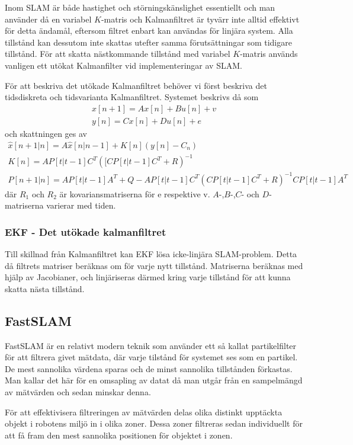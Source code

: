 \documentclass[a4paper,12pt,fleqn]{article}
\begin{document}
Inom SLAM är både hastighet och störningskänslighet essentiellt och man använder då en variabel $K$-matris och Kalmanfiltret är tyvärr inte alltid effektivt för detta ändamål, eftersom filtret enbart kan användas för linjära system. Alla tillstånd kan dessutom inte skattas utefter samma förutsättningar som tidigare tillstånd. För att skatta nästkommande tillstånd med variabel $K$-matris används vanligen ett utökat Kalmanfilter vid implementeringar av SLAM. 

För att beskriva det utökade Kalmanfiltret behöver vi först beskriva det tidsdiskreta och tidsvarianta Kalmanfiltret. Systemet beskrivs då som 
\begin{gather}
x[n+1] = Ax[n] + Bu[n]+v \\
y[n] = Cx[n] + Du[n] + e
\end{gather}
och skattningen ges av
\begin{gather}
	\hat{x}[n+1|n] = A\hat{x}[n|n-1] + K[n](y[n]-C_n) \\
	K[n]=AP[t|t-1]C^T([CP[t|t-1]C^T+R)^{-1}	\\
	P[n+1|n]=AP[t|t-1]A^T+Q 
	        -AP[t|t-1]C^T(CP[t|t-1]C^T+R)^{-1}CP[t|t-1]A^T
\end{gather}
där $R_1$ och $R_2$ är kovariansmatriserna för e respektive v. $A$-,$B$-,$C$- och $D$-matriserna varierar med tiden.  

\subsubsection{EKF - Det utökade kalmanfiltret}

Till skillnad från Kalmanfiltret kan EKF lösa icke-linjära SLAM-problem. Detta då filtrets matriser beräknas om för varje nytt tillstånd. Matriserna beräknas med hjälp av Jacobianer, och linjäriseras därmed kring varje tillstånd för att kunna skatta nästa tillstånd. 

\subsection{FastSLAM}
FastSLAM är en relativt modern teknik som använder ett så kallat partikelfilter för att filtrera givet mätdata, där varje tilstånd för systemet ses som en partikel. De mest sannolika värdena sparas och de minst sannolika tillstånden förkastas. Man kallar det här för en omsapling av datat då man utgår från en sampelmängd av mätvärden och sedan minskar denna. 

För att effektivisera filtreringen av mätvärden delas olika distinkt upptäckta objekt i robotens miljö in i olika zoner. Dessa zoner filtreras sedan individuellt för att få fram den mest sannolika positionen för objektet i zonen. 
\end{document}
